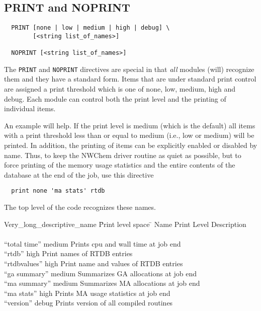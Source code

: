 \subsection{PRINT and NOPRINT}
\label{sec:printcontrol}

\begin{verbatim}
  PRINT [none | low | medium | high | debug] \
        [<string list_of_names>]

  NOPRINT [<string list_of_names>]
\end{verbatim}

The \verb+PRINT+ and \verb+NOPRINT+ directives are special in that
{\em all} modules (will) recognize them and they  have a
standard form.  Items that are under standard print control are
assigned a print threshold which is one of none, low, medium, high and
debug.  Each module can control both the print level and the printing
of individual items.

An example will help.  If the print level is medium (which is the
default) all items with a print threshold less than or equal to medium
(i.e., low or medium) will be printed.  In addition, the printing of
items can be explicitly enabled or disabled by name.  Thus, to keep
the NWChem driver routine as quiet as possible, but to force printing
of the memory usage statistics and the entire contents of the database
at the end of the job, use this directive
\begin{verbatim}
  print none 'ma stats' rtdb
\end{verbatim}

The top level of the code recognizes these names. 
\begin{tabbing}
  Very\_long\_descriptive\_name \= Print level space \= \kill
  Name                   \> Print Level \> Description \\
                         \>        \> \\
 ``total time''        \> medium \> Prints cpu and wall time at job end\\
 ``rtdb''              \> high    \> Print names of RTDB entries\\
 ``rtdbvalues''        \> high    \> Print name and values of RTDB entries\\
 ``ga summary''        \> medium \> Summarizes GA allocations at job end \\
 ``ma summary''        \> medium \> Summarizes MA allocations at job end \\
 ``ma stats''          \> high   \> Prints MA usage statistics at job end \\
 ``version''           \> debug  \> Prints version of all compiled routines \\
\end{tabbing}

